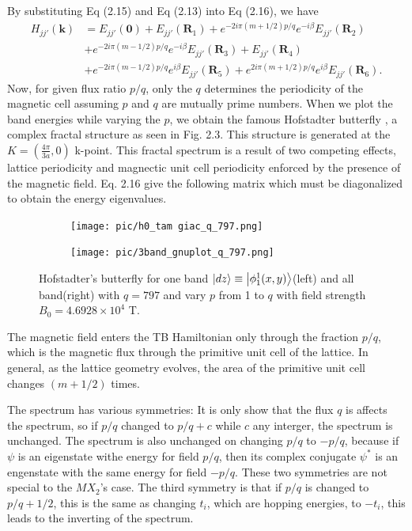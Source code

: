 \documentclass{report}
\begin{document}
By substituting Eq (2.15) and Eq (2.13) into Eq (2.16), we have
\begin{equation}
	\begin{aligned}
		H_{jj'}(\mathbf{k})
		 & = E_{jj'}(\mathbf{0}) + E_{jj'}(\mathbf{R}_{1}) + e^{-2i\pi(m + 1/2)p / q} e^{-i\beta} E_{jj'}(\mathbf{R}_{2})              \\
		 & + e^{-2i\pi(m - 1/2)p / q} e^{-i\beta} E_{jj'}(\mathbf{R}_{3}) + E_{jj'}(\mathbf{R}_{4})                                    \\
		 & + e^{-2i\pi(m - 1/2)p / q} e^{i\beta} E_{jj'}(\mathbf{R}_{5}) + e^{2i\pi(m + 1/2)p / q} e^{i\beta} E_{jj'}(\mathbf{R}_{6}).
	\end{aligned}
\end{equation}
Now, for given flux ratio $p/q$, only the $q$ determines the periodicity of the magnetic cell assuming $p$ and $q$ are mutually prime numbers. When we plot the band energies while varying the $p$, we obtain the famous Hofstadter butterfly \cite{PhysRevB.14.2239}, a complex fractal structure as seen in Fig. 2.3. This structure is generated at the $K = (\frac{4\pi}{3a},0)$ k-point. This fractal spectrum is a result of two competing effects, lattice periodicity and magnectic unit cell periodicity enforced by the presence of the magnetic field. Eq. 2.16 give the following matrix which must be diagonalized to obtain the energy eigenvalues.
\begin{figure}[htb]
	\centering
	\begin{subfigure}[b]{0.495\textwidth}
		\centering
		\texttt{[image: pic/h0\_tam giac\_q\_797.png]}
		\label{fig:3 band}
	\end{subfigure}
	\begin{subfigure}[b]{0.495\textwidth}
		\centering
		\texttt{[image: pic/3band\_gnuplot\_q\_797.png]}
		\label{fig:1 band}
	\end{subfigure}
	\caption{
		Hofstadter’s butterfly for one band $\ket{dz} \equiv \ket{\phi_{1}^{1}(x,y)}$(left) and all band(right) with $q = 797$ and vary $p$  from 1 to $q$ with field strength $B_{0} = 4.6928 \times 10^{4}$ T.
	}
\end{figure}

The magnetic field enters the TB Hamiltonian only through the fraction $p/q$, which is the magnetic flux through the primitive unit cell of the lattice. In general, as the lattice geometry evolves, the area of the primitive unit cell changes $(m + 1/2)$ times.

The spectrum has various symmetries: It is only show that the flux $q$ is affects the spectrum, so if $p/q$ changed to $p/q + c$ while $c$ any interger, the spectrum is unchanged. The spectrum is also unchanged on changing $p/q$ to $-p/q$, because if $\psi$ is an eigenstate withe energy for field $p/q$, then its complex conjugate $\psi^{*}$ is an engenstate with the same energy for field $-p/q$. These two symmetries are not special to the $MX_{2}$'s case. The third symmetry is that if $p/q$ is changed to $p/q + 1/2$, this is the same as changing $t_{i}$, which are hopping energies, to $-t_{i}$, this leads to the inverting of the spectrum. 
\end{document}
